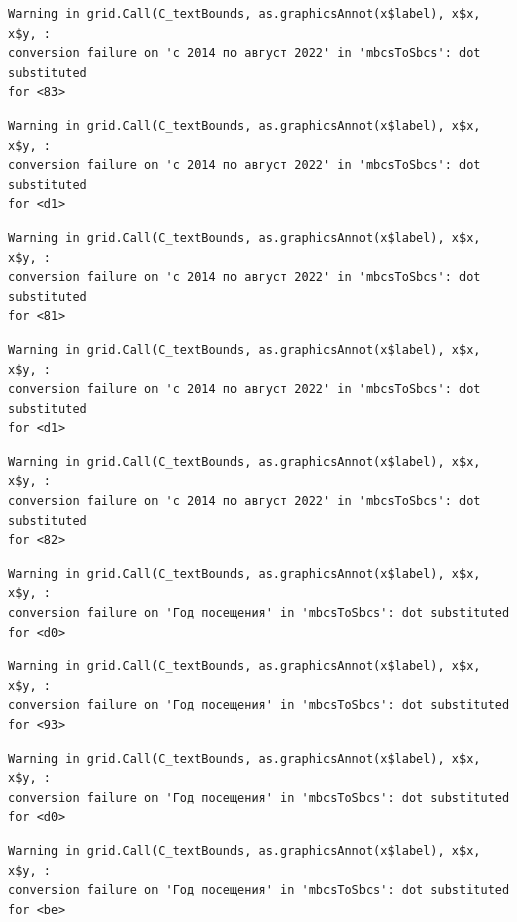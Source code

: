 \documentclass[
  letterpaper,
  DIV=11,
  numbers=noendperiod]{scrartcl}
\begin{document}
\begin{verbatim}
Warning in grid.Call(C_textBounds, as.graphicsAnnot(x$label), x$x, x$y, :
conversion failure on 'с 2014 по август 2022' in 'mbcsToSbcs': dot substituted
for <83>
\end{verbatim}

\begin{verbatim}
Warning in grid.Call(C_textBounds, as.graphicsAnnot(x$label), x$x, x$y, :
conversion failure on 'с 2014 по август 2022' in 'mbcsToSbcs': dot substituted
for <d1>
\end{verbatim}

\begin{verbatim}
Warning in grid.Call(C_textBounds, as.graphicsAnnot(x$label), x$x, x$y, :
conversion failure on 'с 2014 по август 2022' in 'mbcsToSbcs': dot substituted
for <81>
\end{verbatim}

\begin{verbatim}
Warning in grid.Call(C_textBounds, as.graphicsAnnot(x$label), x$x, x$y, :
conversion failure on 'с 2014 по август 2022' in 'mbcsToSbcs': dot substituted
for <d1>
\end{verbatim}

\begin{verbatim}
Warning in grid.Call(C_textBounds, as.graphicsAnnot(x$label), x$x, x$y, :
conversion failure on 'с 2014 по август 2022' in 'mbcsToSbcs': dot substituted
for <82>
\end{verbatim}

\begin{verbatim}
Warning in grid.Call(C_textBounds, as.graphicsAnnot(x$label), x$x, x$y, :
conversion failure on 'Год посещения' in 'mbcsToSbcs': dot substituted for <d0>
\end{verbatim}

\begin{verbatim}
Warning in grid.Call(C_textBounds, as.graphicsAnnot(x$label), x$x, x$y, :
conversion failure on 'Год посещения' in 'mbcsToSbcs': dot substituted for <93>
\end{verbatim}

\begin{verbatim}
Warning in grid.Call(C_textBounds, as.graphicsAnnot(x$label), x$x, x$y, :
conversion failure on 'Год посещения' in 'mbcsToSbcs': dot substituted for <d0>
\end{verbatim}

\begin{verbatim}
Warning in grid.Call(C_textBounds, as.graphicsAnnot(x$label), x$x, x$y, :
conversion failure on 'Год посещения' in 'mbcsToSbcs': dot substituted for <be>
\end{verbatim}
\end{document}
